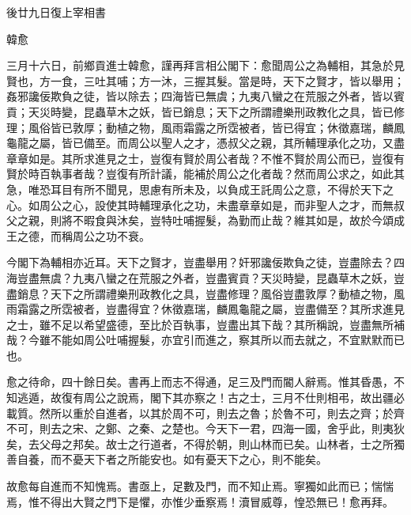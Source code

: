 後廿九日復上宰相書

韓愈

三月十六日，前鄉貢進士韓愈，謹再拜言相公閣下：愈聞周公之為輔相，其急於見賢也，方一食，三吐其哺；方一沐，三握其髮。當是時，天下之賢才，皆以舉用；姦邪讒佞欺負之徒，皆以除去；四海皆已無虞；九夷八蠻之在荒服之外者，皆以賓貢；天災時變，昆蟲草木之妖，皆已銷息；天下之所謂禮樂刑政教化之具，皆已修理；風俗皆已敦厚；動植之物，風雨霜露之所霑被者，皆已得宜；休徵嘉瑞，麟鳳龜龍之屬，皆已備至。而周公以聖人之才，憑叔父之親，其所輔理承化之功，又盡章章如是。其所求進見之士，豈復有賢於周公者哉？不惟不賢於周公而已，豈復有賢於時百執事者哉？豈復有所計議，能補於周公之化者哉？然而周公求之，如此其急，唯恐耳目有所不聞見，思慮有所未及，以負成王託周公之意，不得於天下之心。如周公之心，設使其時輔理承化之功，未盡章章如是，而非聖人之才，而無叔父之親，則將不暇食與沐矣，豈特吐哺握髮，為勤而止哉？維其如是，故於今頌成王之德，而稱周公之功不衰。

今閣下為輔相亦近耳。天下之賢才，豈盡舉用？奸邪讒佞欺負之徒，豈盡除去？四海豈盡無虞？九夷八蠻之在荒服之外者，豈盡賓貢？天災時變，昆蟲草木之妖，豈盡銷息？天下之所謂禮樂刑政教化之具，豈盡修理？風俗豈盡敦厚？動植之物，風雨霜露之所霑被者，豈盡得宜？休徵嘉瑞，麟鳳龜龍之屬，豈盡備至？其所求進見之士，雖不足以希望盛德，至比於百執事，豈盡出其下哉？其所稱說，豈盡無所補哉？今雖不能如周公吐哺握髮，亦宜引而進之，察其所以而去就之，不宜默默而已也。

愈之待命，四十餘日矣。書再上而志不得通，足三及門而閽人辭焉。惟其昏愚，不知逃遁，故復有周公之說焉，閣下其亦察之！古之士，三月不仕則相弔，故出疆必載質。然所以重於自進者，以其於周不可，則去之魯；於魯不可，則去之齊；於齊不可，則去之宋、之鄭、之秦、之楚也。今天下一君，四海一國，舍乎此，則夷狄矣，去父母之邦矣。故士之行道者，不得於朝，則山林而已矣。山林者，士之所獨善自養，而不憂天下者之所能安也。如有憂天下之心，則不能矣。

故愈每自進而不知愧焉。書亟上，足數及門，而不知止焉。寧獨如此而已；惴惴焉，惟不得出大賢之門下是懼，亦惟少垂察焉！瀆冒威尊，惶恐無已！愈再拜。